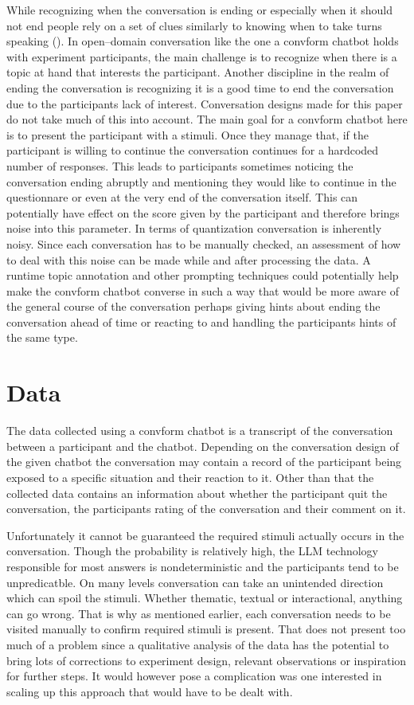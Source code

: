 \documentclass[12pt]{report}
\begin{document}
{While recognizing when the conversation is ending
or especially when it should not end
people rely on a set of clues
similarly to knowing when to take turns speaking ().
In open–domain conversation
like the one a convform chatbot holds with experiment participants,
the main challenge is to recognize
when there is a topic at hand
that interests the participant.
Another discipline in the realm of ending the conversation
is recognizing it is a good time to end the conversation
due to the participants lack of interest.
Conversation designs made for this paper
do not take much of this into account.
The main goal for a convform chatbot here
is to present the participant with a stimuli.
Once they manage that,
if the participant is willing to continue
the conversation continues for a hardcoded number of responses.
This leads to participants sometimes noticing
the conversation ending abruptly
and mentioning they would like to continue
in the questionnare
or even at the very end of the conversation itself.
This can potentially have effect on
the score given by the participant
and therefore brings noise into this parameter.
In terms of quantization
conversation is inherently noisy.
Since each conversation has to be manually checked,
an assessment of how to deal with this noise can be made
while and after processing the data.
A runtime topic annotation
and other prompting techniques
could potentially help make
the convform chatbot converse in such a way
that would be more aware of the general course of the conversation
perhaps giving hints about ending the conversation ahead of time
or reacting to and handling the participants hints of the same type.

\chapter{Data}

The data collected using a convform chatbot
is a transcript of the conversation
between a participant and the chatbot.
Depending on the conversation design of the given chatbot
the conversation may contain a record of
the participant being exposed to a specific situation
and their reaction to it.
Other than that the collected data contains
an information about whether the participant quit the conversation,
the participants rating of the conversation
and their comment on it.

Unfortunately it cannot be guaranteed
the required stimuli actually occurs in the conversation.
Though the probability is relatively high,
the LLM technology responsible for most answers
is nondeterministic
and the participants tend to be unpredicatble.
On many levels conversation can take an unintended direction
which can spoil the stimuli.
Whether thematic, textual or interactional,
anything can go wrong.
That is why as mentioned earlier,
each conversation needs to be visited manually
to confirm required stimuli is present.
That does not present too much of a problem
since a qualitative analysis of the data
has the potential to bring lots of
corrections to experiment design,
relevant observations or
inspiration for further steps.
It would however pose a complication
was one interested in scaling up this approach
that would have to be dealt with.



}
\end{document}

